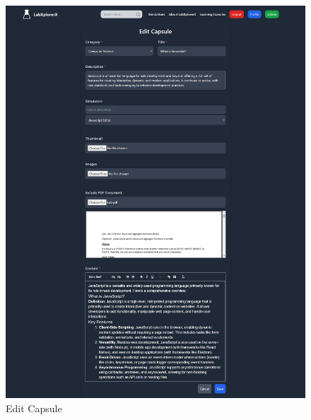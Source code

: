  \begin{figure}[H]
    \centering
     \includegraphics[width = 16cm]{Diagrams/output/edit_capsule.png}
     \caption{Edit Capsule}
 \end{figure}
